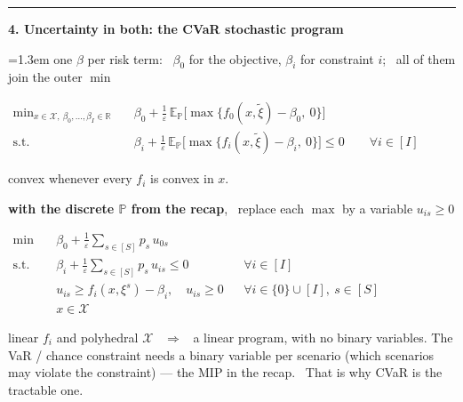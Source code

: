 \documentclass[10pt]{article}
\newcommand{\beat}[2]{%
  \par\bigskip\vspace{4pt}
  {\color{ruleink}\rule{\textwidth}{1pt}}\par\nobreak\vspace{4pt}
  {\large\bfseries #1.\; #2}\par\nobreak\vspace{6pt}}
\newenvironment{board}{%
  \par\vspace{4pt}
  \begingroup\leftskip=1.3em\relax\parskip=2pt\relax}{%
  \par\endgroup\vspace{4pt}}
\newcommand{\E}{\mathbb{E}}
\newcommand{\Prob}{\mathbb{P}}
\newcommand{\xit}{\tilde\xi}
\begin{document}
\beat{4}{Uncertainty in both: the CVaR stochastic program}
\begin{board}
\quad one $\beta$ per risk term: \ $\beta_0$ for the objective, $\beta_i$ for constraint $i$; \ all of them join the outer $\min$
\vspace{4pt}

\begin{center}
$\begin{aligned}
  \min_{x \in \mathcal{X},\ \beta_0, \dots, \beta_I \in \mathbb{R}}\quad
    & \beta_0 + \frac{1}{\varepsilon}\,\E_{\Prob}\Big[\max\big\{f_0(x, \xit) - \beta_0,\ 0\big\}\Big] \\
  \text{s.t.}\quad
    & \beta_i + \frac{1}{\varepsilon}\,\E_{\Prob}\Big[\max\big\{f_i(x, \xit) - \beta_i,\ 0\big\}\Big] \le 0 \qquad \forall i \in [I]
\end{aligned}$
\end{center}
\vspace{4pt}

\quad convex whenever every $f_i$ is convex in $x$.
\vspace{5pt}

\quad \textbf{with the discrete $\Prob$ from the recap}, \ replace each $\max$ by a variable $u_{is} \ge 0$
\vspace{4pt}

\begin{center}
$\begin{aligned}
  \min\quad & \beta_0 + \frac{1}{\varepsilon}\sum_{s \in [S]} p_s\, u_{0s} \\
  \text{s.t.}\quad & \beta_i + \frac{1}{\varepsilon}\sum_{s \in [S]} p_s\, u_{is} \le 0 && \forall i \in [I] \\
                   & u_{is} \ge f_i(x, \xi^s) - \beta_i, \quad u_{is} \ge 0 && \forall i \in \{0\} \cup [I],\ s \in [S] \\
                   & x \in \mathcal{X}
\end{aligned}$
\end{center}
\vspace{4pt}

\quad linear $f_i$ and polyhedral $\mathcal{X}$ \ $\Rightarrow$ \ a linear program, with no binary variables. \quad
The VaR / chance constraint needs a binary variable per scenario (which scenarios may violate the constraint)
--- the MIP in the recap. \ That is why CVaR is the tractable one.
\end{board}
\end{document}
